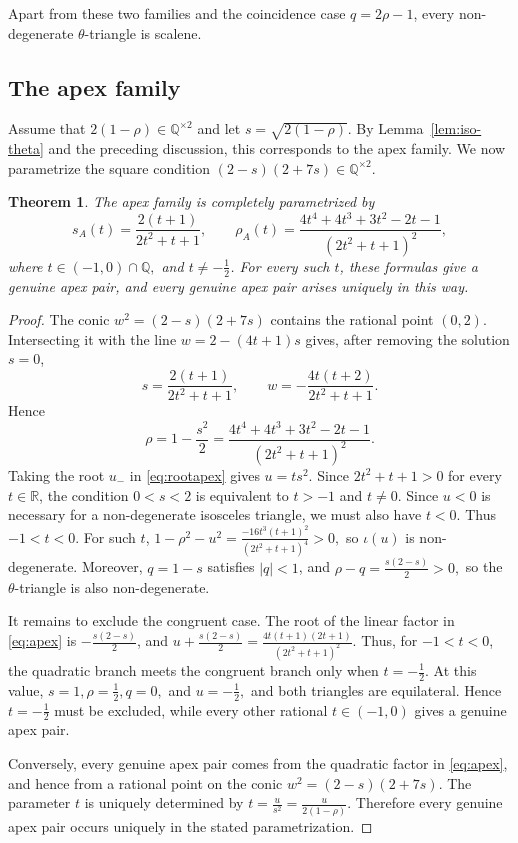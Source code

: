 \documentclass[11pt]{amsart}
\theoremstyle{plain}
\newtheorem{thm}{Theorem}[section]
\theoremstyle{remark}
\theoremstyle{plain}
\newcommand{\Q}{\mathbb{Q}}
\newcommand{\R}{\mathbb{R}}
\begin{document}
Apart from these two families and the coincidence case $q=2\rho-1$,
every non-degenerate $\theta$-triangle is scalene.


\subsection{The apex family}
Assume that $2(1-\rho)\in \Q^{\times 2}$ and let $s=\sqrt{2(1-\rho)}$. By Lemma~\ref{lem:iso-theta} and the preceding discussion,
this corresponds to the apex family. We now parametrize the
square condition $(2-s)(2+7s)\in\Q^{\times 2}$.
\begin{thm} \label{thm:family-A}
The apex family is completely parametrized by
\begin{equation}\label{eq:apex-param}
s_A(t)=\frac{2(t+1)}{2t^2+t+1},
\qquad
\rho_A(t)=
\frac{4t^4+4t^3+3t^2-2t-1}
     {(2t^2+t+1)^2},
\end{equation}
where
$t\in(-1,0)\cap\Q,$ and $ t\ne-\frac12$.
For every such $t$, these formulas give a genuine apex pair, and every
genuine apex pair arises uniquely in this way.
\end{thm}

\begin{proof}
The conic $
w^2=(2-s)(2+7s)$
contains the rational point $(0,2)$. Intersecting it with the line $
w=2-(4t+1)s$
gives, after removing the solution $s=0$,
\[
s=\frac{2(t+1)}{2t^2+t+1},
\qquad
w=-\frac{4t(t+2)}{2t^2+t+1}.
\]
Hence
\[
\rho=1-\frac{s^2}{2}
=
\frac{4t^4+4t^3+3t^2-2t-1}
     {(2t^2+t+1)^2}.
\]
Taking the root $u_-$ in \eqref{eq:rootapex} gives
$
u=ts^2.$ Since $2t^2+t+1>0$ for every $t\in\R$, the condition
$0<s<2$ is equivalent to $t>-1$ and $t\ne0$. Since $u<0$ is
necessary for a non-degenerate isosceles triangle, we must also have
$t<0$. Thus
$-1<t<0.$
For such $t$,
$
1-\rho^2-u^2
=
\frac{-16t^3(t+1)^2}{(2t^2+t+1)^4}>0,$
so $\iota(u)$ is non-degenerate. Moreover, $q=1-s$ satisfies
$|q|<1$, and
$
\rho-q=\frac{s(2-s)}2>0,
$
so the $\theta$-triangle is also non-degenerate.

It remains to exclude the congruent case. The root of the linear
factor in \eqref{eq:apex} is $-\frac{s(2-s)}2$, and
$
u+\frac{s(2-s)}2
=
\frac{4t(t+1)(2t+1)}{(2t^2+t+1)^2}.
$
Thus, for $-1<t<0$, the quadratic branch meets the congruent branch
only when $t=-\frac12$. At this value,
$
s=1,
\rho=\frac12,
q=0,$ and $
u=-\frac12, $
and both triangles are equilateral. Hence $t=-\frac12$ must be
excluded, while every other rational $t\in(-1,0)$ gives a genuine
apex pair.

Conversely, every genuine apex pair comes from the quadratic factor in
\eqref{eq:apex}, and hence from a rational point on the conic
$w^2=(2-s)(2+7s)$. The parameter $t$ is uniquely determined by
$t=\frac{u}{s^2}=\frac{u}{2(1-\rho)}.$
Therefore every genuine apex pair occurs uniquely in the stated
parametrization.
\end{proof}
\end{document}
